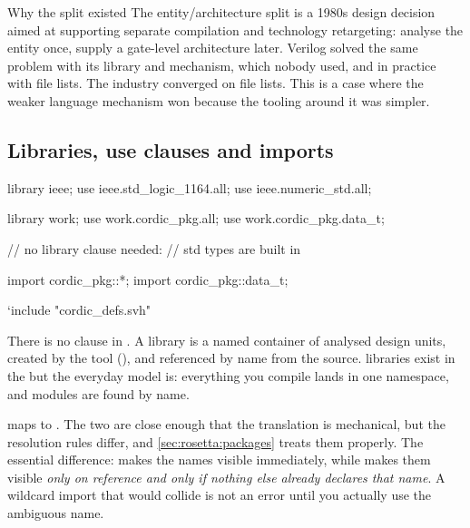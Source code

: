 \begin{notebox}{Why the split existed}
The entity/architecture split is a 1980s design decision aimed at supporting
separate compilation and technology retargeting: analyse the entity once,
supply a gate-level architecture later. Verilog solved the same problem with
its library and  mechanism, which nobody used, and in practice with
file lists. The industry converged on file lists. This is a case where the
weaker language mechanism won because the tooling around it was simpler.
\end{notebox}

\subsection{Libraries, use clauses and imports}

\begin{rosetta}
\begin{rleft}
library ieee;
use ieee.std_logic_1164.all;
use ieee.numeric_std.all;

library work;
use work.cordic_pkg.all;
use work.cordic_pkg.data_t;
\end{rleft}
\begin{rright}
// no library clause needed:
// std types are built in

import cordic_pkg::*;
import cordic_pkg::data_t;

`include "cordic_defs.svh"
\end{rright}
\end{rosetta}


There is no  clause in \SV{}. A \VHDL{} library is a named
container of analysed design units, created by the tool
(), and referenced by name from the source. \SV{}
libraries exist in the \LRM{} but the everyday model is: everything you compile
lands in one namespace, and modules are found by name.

 maps to . The two are close enough
that the translation is mechanical, but the resolution rules differ, and
\cref{sec:rosetta:packages} treats them properly. The essential difference:
 makes the names visible immediately, while
 makes them visible \emph{only on reference and only if
nothing else already declares that name}. A wildcard import that would collide
is not an error until you actually use the ambiguous name.

